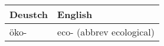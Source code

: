 \documentclass{article}
\renewcommand{\arraystretch}{1}
\begin{document}
\hfill
\begin{minipage}{0.48\textwidth}
    \centering
    \renewcommand{\arraystretch}{1.5}
    \begin{tabular}{|>{\raggedright\arraybackslash}p{3.5cm}|>{\raggedright\arraybackslash}p{3.5cm}|}
        \hline
        \rowcolor{gray!20} \textbf{Deustch} & \textbf{English} \\
        \hline
        öko- & eco- (abbrev ecological) \\\hline
    \end{tabular}
\end{minipage}
\end{document}
